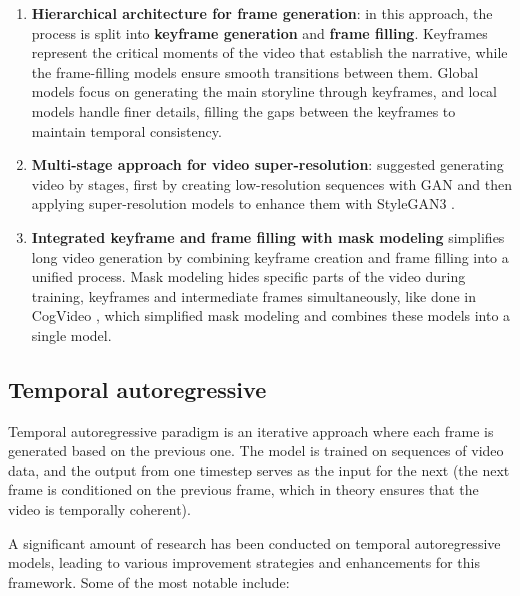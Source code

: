 \begin{enumerate}
    \item \textbf{Hierarchical architecture for frame generation}: in this approach, the process is split into \textbf{keyframe generation} and \textbf{frame filling}. Keyframes represent the critical moments of the video that establish the narrative, while the frame-filling models ensure smooth transitions between them. Global models focus on generating the main storyline through keyframes, and local models handle finer details, filling the gaps between the keyframes to maintain temporal consistency.
    \item \textbf{Multi-stage approach for video super-resolution}: \cite{brooks2022generating} suggested generating video by stages, first by creating low-resolution sequences with GAN and then applying super-resolution models to enhance them with StyleGAN3 \cite{stylegan3}.
    \item \textbf{Integrated keyframe and frame filling with mask modeling} simplifies long video generation by combining keyframe creation and frame filling into a unified process. Mask modeling hides specific parts of the video during training, keyframes and intermediate frames simultaneously, like done in CogVideo \cite{cogvideo}, which simplified mask modeling and combines these models into a single model.
\end{enumerate}

\subsection*{Temporal autoregressive}

Temporal autoregressive paradigm is an iterative approach where each frame is generated based on the previous one. The model is trained on sequences of video data, and the output from one timestep serves as the input for the next (the next frame is conditioned on the previous frame, which in theory ensures that the video is temporally coherent).

A significant amount of research has been conducted on temporal autoregressive models, leading to various improvement strategies and enhancements for this framework. Some of the most notable include:

